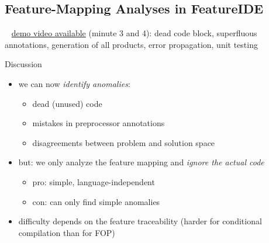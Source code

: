 \subsection{Feature-Mapping Analyses in FeatureIDE}

\begin{frame}{\myframetitle}
	\begin{mycolumns}[widths={57,43}]
		~
		\href{https://youtu.be/jVe7f32mLCQ?t=125}{demo video available} (minute 3 and 4): dead code block, superfluous annotations, generation of all products, error propagation, unit testing
	\mynextcolumn
		\begin{note}{Discussion}
			\begin{itemize}
				\item we can now \emph{identify anomalies}:
				\begin{itemize}
					\item dead (unused) code
					\item mistakes in preprocessor annotations
					\item disagreements between problem and solution space
				\end{itemize}
				\item but: we only analyze the feature mapping and \emph{ignore the actual code}
				\begin{itemize}
					\item pro: simple, language-independent
					\item con: can only find simple anomalies
				\end{itemize}
				\item difficulty depends on the feature traceability (harder for conditional compilation than for FOP)
			\end{itemize}
		\end{note}
	\end{mycolumns}
\end{frame}
